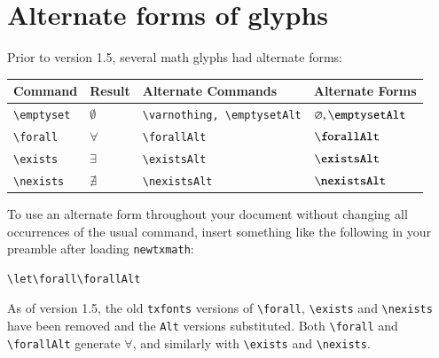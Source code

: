 \documentclass[\fsc]{article}
\theoremstyle{oldplain}
\theoremstyle{plain}
\begin{document}
%


\section{Alternate forms of glyphs}
Prior to version 1.5, several math glyphs had alternate forms:
\begin{center}
  \begin{tabular}{@{} llll @{}}
    \hline
    Command & Result &  Alternate Commands & Alternate Forms\\ 
    \hline
    \verb|\emptyset| & $\emptyset$ & \verb|\varnothing, \emptysetAlt|& $\varnothing, \emptysetAlt$ \\ 
    \verb|\forall| & $\forall$ & \verb|\forallAlt| & $\forallAlt$ \\ 
    \verb|\exists| & $\exists$ & \verb|\existsAlt| & $\existsAlt$ \\ 
    \verb|\nexists| & $\nexists$ & \verb|\nexistsAlt| & $\nexistsAlt$ \\ 
    \hline
  \end{tabular}
\end{center}

To use an alternate form throughout your document without changing all occurrences of the usual command, insert something like the following in your preamble after loading \texttt{newtxmath}:
\begin{verbatim}
\let\forall\forallAlt
\end{verbatim}
As of version 1.5, the old {\tt txfonts} versions of \verb|\forall|, \verb|\exists| and \verb|\nexists| have been removed and the {\tt Alt} versions substituted. Both \verb|\forall| and \verb|\forallAlt| generate $\forall$, and similarly with \verb|\exists| and \verb|\nexists|.
\end{document}
